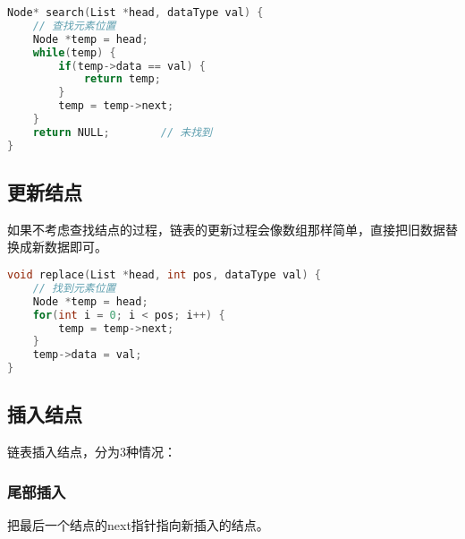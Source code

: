 
\begin{lstlisting}[language=C]
Node* search(List *head, dataType val) {
    // 查找元素位置
    Node *temp = head;
    while(temp) {
        if(temp->data == val) {
            return temp;
        }
        temp = temp->next;
    }
    return NULL;        // 未找到
}
\end{lstlisting}

\subsection{更新结点}

如果不考虑查找结点的过程，链表的更新过程会像数组那样简单，直接把旧数据替换成新数据即可。 \\


\begin{lstlisting}[language=C]
void replace(List *head, int pos, dataType val) {
    // 找到元素位置
    Node *temp = head;
    for(int i = 0; i < pos; i++) {
        temp = temp->next;
    }
    temp->data = val;
}
\end{lstlisting}

\subsection{插入结点}

链表插入结点，分为3种情况：

\subsubsection{尾部插入}

把最后一个结点的next指针指向新插入的结点。

